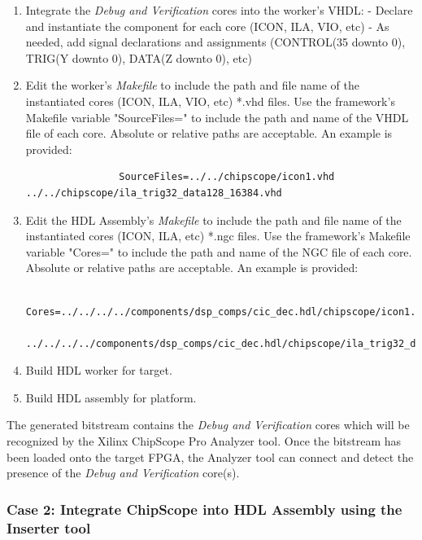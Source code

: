 \begin{flushleft}
		\begin{enumerate}
			\item Integrate the \textit{Debug and Verification} cores into the worker's VHDL:
				\subitem - Declare and instantiate the component for each core (ICON, ILA, VIO, etc)
				\subitem - As needed, add signal declarations and assignments (CONTROL(35 downto 0), TRIG(Y downto 0), DATA(Z downto 0), etc)
			\item Edit the worker's \textit{Makefile} to include the path and file name of the
			instantiated cores (ICON, ILA, VIO, etc) *.vhd files. Use the framework's Makefile
			variable "SourceFiles=" to include the path and	name of the VHDL file of each core.
			Absolute or relative paths are acceptable. An example is provided:
			\small\begin{verbatim}
				SourceFiles=../../chipscope/icon1.vhd ../../chipscope/ila_trig32_data128_16384.vhd
			\end{verbatim}
		 	\item Edit the HDL Assembly's \textit{Makefile} to include the path and file name of
		 	the	instantiated cores (ICON, ILA, etc) *.ngc files. Use the framework's
		 	Makefile variable "Cores=" to include the path and name of the NGC file of each
		 	core. Absolute or relative paths are acceptable. An example is provided:
		 	\small\begin{verbatim}
		 		Cores=../../../../components/dsp_comps/cic_dec.hdl/chipscope/icon1.ngc
		 		../../../../components/dsp_comps/cic_dec.hdl/chipscope/ila_trig32_data128_16384.ngc
		 	\end{verbatim}
		 	\item Build HDL worker for target.
			\item Build HDL assembly for platform.
		\end{enumerate}

		The generated bitstream contains the \textit{Debug and Verification} cores which will be recognized by the Xilinx ChipScope Pro Analyzer tool. Once the bitstream has been loaded onto the target FPGA, the Analyzer tool can connect and detect the presence of the \textit{Debug and Verification} core(s).

	\newpage

	\subsubsection{Case 2: Integrate ChipScope into HDL Assembly using the Inserter tool}


\end{flushleft}
